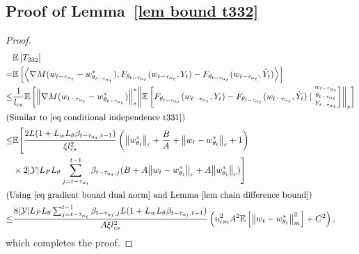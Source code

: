 \documentclass[twoside,11pt]{article}
\newcommand{\fY}{\mathcal{Y}}
\newcommand{\E}{\mathbb{E}}
\newcommand{\ny}{{|\fY|}}
\newcommand{\indot}[2]{{\left<#1, #2\right>}}
\numberwithin{assucounter}{section}
\begin{document}
\subsection{Proof of Lemma~\ref{lem bound t332}}
\label{sec proof lem bound t332}
\lemboundtthreethreetwo*
\begin{proof}
  \begin{align}
      &\E\left[T_{332}\right] \\
      = &\E\left[\indot{\nabla M(w_{t-\tau_{\alpha_t}} - w^*_{\theta_{t-\tau_{\alpha_t}}})}{F_{\theta_{t - \tau_{\alpha_t}}}(w_{t- \tau_{\alpha_t}}, Y_t) -F_{\theta_{t - \tau_{\alpha_t}}}(w_{t- \tau_{\alpha_t}}, \tilde Y_t)}\right] \\
      \leq & \frac{1}{l_{cs}} \E\left[\norm{\nabla M(w_{t-\tau_{\alpha_t}} - w^*_{\theta_{t-\tau_{\alpha_t}}})}_s^* \norm{ \E \left[{F_{\theta_{t - \tau_{\alpha_t}}}(w_{t- \tau_{\alpha_t}}, Y_t) -F_{\theta_{t - \tau_{\alpha_t}}}(w_{t- \tau_{\alpha_t}}, \tilde Y_t)} \mid \substack{w_{t-\tau_{\alpha_t}} \\ \theta_{t-\tau_{\alpha_t}} \\ Y_{t-\tau_{\alpha_t}}} \right]}_s\right] \\
      \intertext{\hfill (Similar to \eqref{eq conditional independence t331})}
      \leq& \E \Bigg[\frac{2L(1 + L_wL_\theta \beta_{t-\tau_{\alpha_t}, t-1})}{\xi l_{cs}^2}\left(\norm{w^*_{\theta_t}}_c + \frac{B}{A} + \norm{w_t - w^*_{\theta_t}}_c + 1\right) \\
      &\times 2\ny L_PL_\theta \sum_{j=t-\tau_{\alpha_t}}^{t-1}\beta_{t-\tau_{\alpha_t}, j}(B + A \norm{w_t - w^*_{\theta_t}}_c + A \norm{w^*_{\theta_t}}_c) \Bigg] \\
      \intertext{\hfill (Using \eqref{eq gradient bound dual norm} and Lemma \ref{lem chain difference bound})}
      \leq & \frac{8 \ny L_P L_\theta \sum_{j=t-\tau_{\alpha_t}}^{t-1}\beta_{t-\tau_{\alpha_t}, j} L(1 + L_wL_\theta \beta_{t-\tau_{\alpha_t}, t-1})}{A \xi l_{cs}^2} \left(u_{cm}^2 A^2 \E\left[\norm{w_t - w^*_{\theta_t}}_m^2\right] + C^2\right),
  \end{align}
  which completes the proof.
\end{proof}
\end{document}
